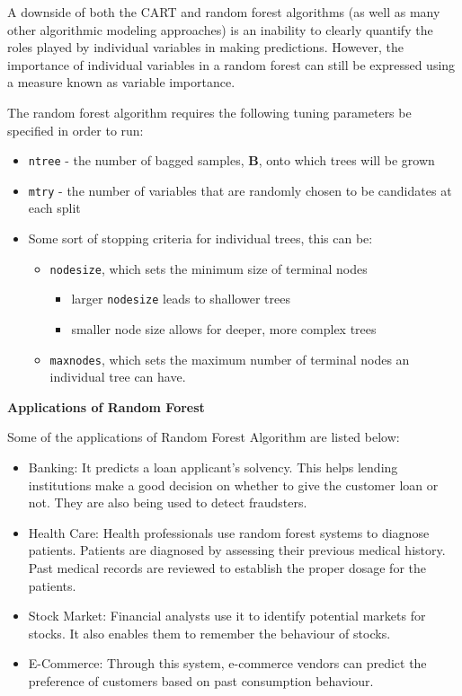 \documentclass[
  a4paper,
  twoside,
  openright]{book}
\providecommand{\tightlist}{%
  \setlength{\itemsep}{0pt}\setlength{\parskip}{0pt}}
\theoremstyle{definition}
\theoremstyle{definition}
\theoremstyle{definition}
\theoremstyle{definition}
\theoremstyle{remark}
\begin{document}
A downside of both the CART and random forest algorithms (as well as many other algorithmic modeling approaches) is an inability to clearly quantify the roles played by individual variables in making predictions. However, the importance of individual variables in a random forest can still be expressed using a measure known as variable importance.

The random forest algorithm requires the following tuning parameters be specified in order to run:

\begin{itemize}
\tightlist
\item
  \texttt{ntree} - the number of bagged samples, \(\boldsymbol{B}\), onto which trees will be grown
\item
  \texttt{mtry} - the number of variables that are randomly chosen to be candidates at each split
\item
  Some sort of stopping criteria for individual trees, this can be:

  \begin{itemize}
  \tightlist
  \item
    \texttt{nodesize}, which sets the minimum size of terminal nodes

    \begin{itemize}
    \tightlist
    \item
      larger \texttt{nodesize} leads to shallower trees
    \item
      smaller node size allows for deeper, more complex trees
    \end{itemize}
  \item
    \texttt{maxnodes}, which sets the maximum number of terminal nodes an individual tree can have.
  \end{itemize}
\end{itemize}

\textbf{Applications of Random Forest}

Some of the applications of Random Forest Algorithm are listed below:

\begin{itemize}
\tightlist
\item
  Banking: It predicts a loan applicant's solvency. This helps lending institutions make a good decision on whether to give the customer loan or not. They are also being used to detect fraudsters.
\item
  Health Care: Health professionals use random forest systems to diagnose patients. Patients are diagnosed by assessing their previous medical history. Past medical records are reviewed to establish the proper dosage for the patients.
\item
  Stock Market: Financial analysts use it to identify potential markets for stocks. It also enables them to remember the behaviour of stocks.
\item
  E-Commerce: Through this system, e-commerce vendors can predict the preference of customers based on past consumption behaviour.
\end{itemize}
\end{document}
